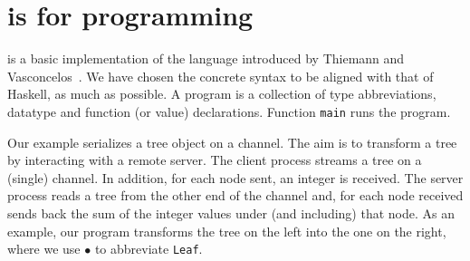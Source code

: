\section{\freest{} is for programming}
\label{sec:programming}

\freest{} is a basic implementation of the language introduced by
Thiemann and Vasconcelos~\cite{DBLP:conf/icfp/ThiemannV16}.
%
We have chosen the concrete syntax to be aligned with that of Haskell,
as much as possible. A \freest{} program is a collection of type
abbreviations, datatype and function (or value) declarations. Function
\lstinline|main| runs the program.

Our example serializes a tree object on a channel. The aim is to
transform a tree by interacting with a remote server. The client
process streams a tree on a (single) channel. In addition, for each
node sent, an integer is received. The server process reads a tree
from the other end of the channel and, for each node received sends
back the sum of the integer values under (and including) that
node.
%
\newcommand{\leaf}{$\bullet$}
%
As an example, our program transforms the tree on the left into the one
on the right, where we use \leaf{} to abbreviate \lstinline|Leaf|.

